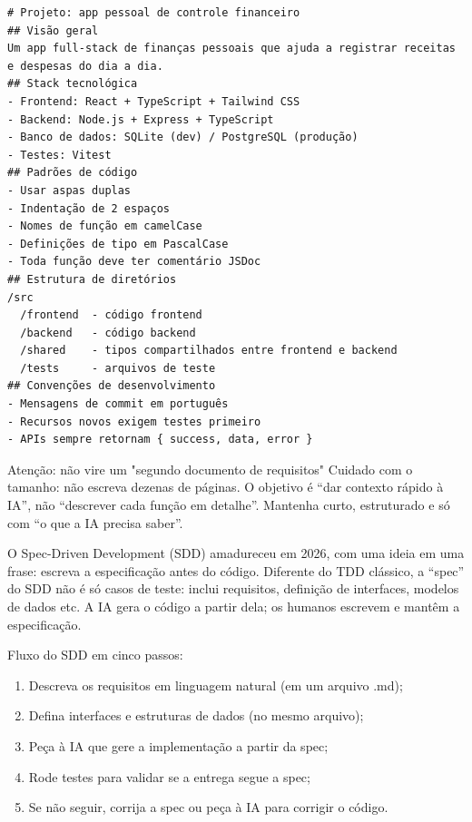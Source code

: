 \begin{lstlisting}
# Projeto: app pessoal de controle financeiro
## Visão geral
Um app full-stack de finanças pessoais que ajuda a registrar receitas e despesas do dia a dia.
## Stack tecnológica
- Frontend: React + TypeScript + Tailwind CSS
- Backend: Node.js + Express + TypeScript
- Banco de dados: SQLite (dev) / PostgreSQL (produção)
- Testes: Vitest
## Padrões de código
- Usar aspas duplas
- Indentação de 2 espaços
- Nomes de função em camelCase
- Definições de tipo em PascalCase
- Toda função deve ter comentário JSDoc
## Estrutura de diretórios
/src
  /frontend  - código frontend
  /backend   - código backend
  /shared    - tipos compartilhados entre frontend e backend
  /tests     - arquivos de teste
## Convenções de desenvolvimento
- Mensagens de commit em português
- Recursos novos exigem testes primeiro
- APIs sempre retornam { success, data, error }
\end{lstlisting}

\begin{tcbwarn}{Atenção: não vire um "segundo documento de requisitos"}
Cuidado com o tamanho: não escreva dezenas de páginas. O objetivo é “dar contexto rápido à IA”, não “descrever cada função em detalhe”. Mantenha curto, estruturado e só com “o que a IA precisa saber”.

\end{tcbwarn}


O Spec-Driven Development (SDD) amadureceu em 2026, com uma ideia em uma frase: escreva a especificação antes do código. Diferente do TDD clássico, a “spec” do SDD não é só casos de teste: inclui requisitos, definição de interfaces, modelos de dados etc. A IA gera o código a partir dela; os humanos escrevem e mantêm a especificação.

Fluxo do SDD em cinco passos:

\begin{enumerate}
  \item Descreva os requisitos em linguagem natural (em um arquivo .md);
  \item Defina interfaces e estruturas de dados (no mesmo arquivo);
  \item Peça à IA que gere a implementação a partir da spec;
  \item Rode testes para validar se a entrega segue a spec;
  \item Se não seguir, corrija a spec ou peça à IA para corrigir o código.
\end{enumerate}

